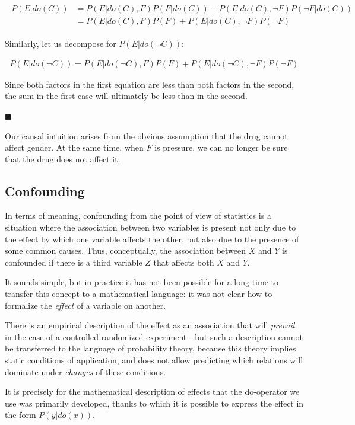 \documentclass[fleqn]{article}
\numberwithin{equation}{section}
\numberwithin{theorem}{section}
\numberwithin{figure}{section}
\numberwithin{lemma}{section}
\numberwithin{corollary}{section}
\begin{document}
\begin{align}
	\begin{split}
		P(E|do(C)) &= P(E|do(C),F)P(F|do(C)) + P(E|do(C),\neg F)P(\neg F| do(C)) \\
		&= P(E|do(C),F)P(F) + P(E|do(C),\neg F)P(\neg F)
	\end{split}
\end{align}

Similarly, let us decompose for $P(E|do(\neg C))$:

\begin{align}
	P(E|do(\neg C)) = P(E|do(\neg C),F)P(F) + P(E|do(\neg C),\neg F)P(\neg F)
\end{align}

Since both factors in the first equation are less than both factors in the second, the sum in the first case will ultimately be less than in the second.

$\blacksquare$

Our causal intuition arises from the obvious assumption that the drug cannot affect gender. At the same time, when $F$ is pressure, we can no longer be sure that the drug does not affect it.

\subsection*{Confounding}

In terms of meaning, confounding from the point of view of statistics is a situation where the association between two variables is present not only due to the effect by which one variable affects the other, but also due to the presence of some common causes. Thus, conceptually, the association between $X$ and $Y$ is confounded if there is a third variable $Z$ that affects both $X$ and $Y$.

It sounds simple, but in practice it has not been possible for a long time to transfer this concept to a mathematical language: it was not clear how to formalize the \textit{effect} of a variable on another.

There is an empirical description of the effect as an association that will \textit{prevail} in the case of a controlled randomized experiment - but such a description cannot be transferred to the language of probability theory, because this theory implies static conditions of application, and does not allow predicting which relations will dominate under \textit{changes} of these conditions.

It is precisely for the mathematical description of effects that the do-operator we use was primarily developed, thanks to which it is possible to express the effect in the form $P(y|do(x))$.
\end{document}
